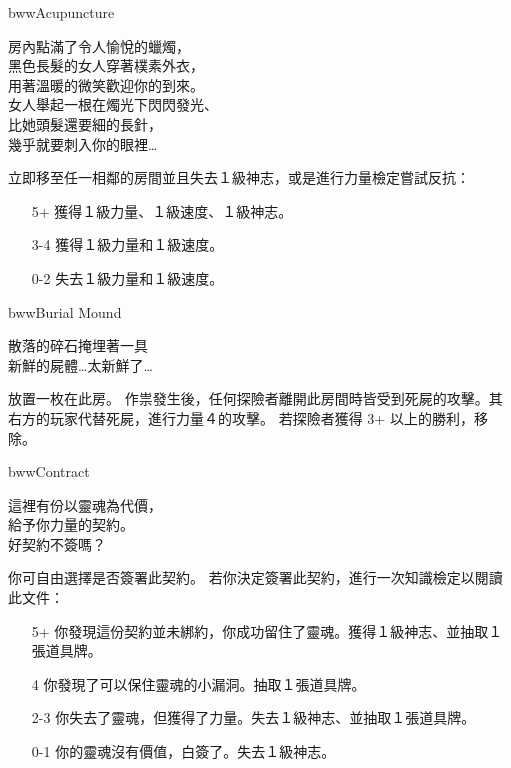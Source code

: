 %
\begin{EventCard}{bww}{Acupuncture}
	\begin{CardStory}
		房內點滿了令人愉悅的蠟燭，\\
		黑色長髮的女人穿著樸素外衣，\\
		用著溫暖的微笑歡迎你的到來。\\
		女人舉起一根在燭光下閃閃發光、\\
		比她頭髮還要細的長針，\\
		幾乎就要刺入你的眼裡…
	\end{CardStory}
	立即移至任一相鄰的房間並且失去１級神志，或是進行力量檢定嘗試反抗：
	\begin{itemize}
		\item[5+] 獲得１級力量、１級速度、１級神志。
		\item[3-4] 獲得１級力量和１級速度。
		\item[0-2] 失去１級力量和１級速度。
	\end{itemize}
\end{EventCard}%
\linebreak[0]%
\begin{EventCard}{bww}{Burial Mound}
	\begin{CardStory}
		散落的碎石掩埋著一具\\
		新鮮的屍體…太新鮮了…
	\end{CardStory}
	放置一枚在此房。\smallbreak
	作祟發生後，任何探險者離開此房間時皆受到死屍的攻擊。其右方的玩家代替死屍，進行力量４的攻擊。\smallbreak
	若探險者獲得 3+ 以上的勝利，移除。\smallbreak
\end{EventCard}%
\linebreak[0]%
\begin{EventCard}{bww}{Contract}
	\begin{CardStory}
		這裡有份以靈魂為代價，\\
		給予你力量的契約。\\
		好契約不簽嗎？
	\end{CardStory}
	你可自由選擇是否簽署此契約。\smallbreak
	若你決定簽署此契約，進行一次知識檢定以閱讀此文件：
	\begin{itemize}
		\item[5+] 你發現這份契約並未綁約，你成功留住了靈魂。獲得１級神志、並抽取１張道具牌。
		\item[4] 你發現了可以保住靈魂的小漏洞。抽取１張道具牌。
		\item[2-3] 你失去了靈魂，但獲得了力量。失去１級神志、並抽取１張道具牌。
		\item[0-1] 你的靈魂沒有價值，白簽了。失去１級神志。
	\end{itemize}
\end{EventCard}%
